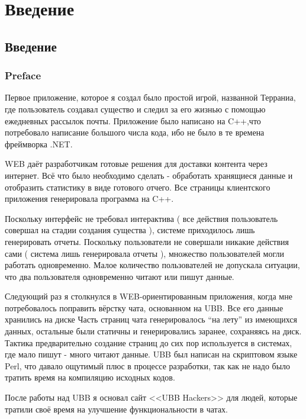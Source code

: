 \chapter*{Введение}							%


\section{ Введение} \label{sect1_1}

\subsection{Preface} \label{subsect1_1_1}

Первое приложение, которое я создал было простой игрой, названной Терраниа, где пользователь создавал существо и следил за его жизнью с помощью ежедневных рассылок почты. Приложение было написано на C++,что потребовало написание большого числа кода, ибо не было в те времена фреймворка .NET.

WEB  даёт разработчикам готовые решения для доставки контента через интернет. Всё что было необходимо сделать - обработать хранящиеся данные и отобразить статистику в виде готового отчего. Все страницы клиентского приложения генерировала программа на C++.

Поскольку интерфейс не требовал интерактива ( все действия пользователь совершал на стадии создания существа ),  системе приходилось лишь генерировать отчеты. Поскольку пользователи не совершали никакие действия сами ( система лишь генерировала отчеты ), множество пользователей могли работать одновременно. Малое количество пользователей не допускала ситуации, что два пользователя одновременно читают или пишут данные.


Следующий раз я столкнулся в WEB-ориентированным приложения, когда мне потребовалось поправить вёрстку чата, основанном на  UBB. Все его данные хранились на диске Часть страниц чата генерировалось ``на лету'' из имеющихся данных, остальные были статичны и генерировались заранее, сохраняясь на диск. Тактика предварительно создание страниц до сих пор используется в системах, где мало пишут - много читают данные. UBB был написан на скриптовом языке Perl, что давало ощутимый плюс в процессе разработки, так как не надо было тратить время на компиляцию исходных кодов.

После работы над UBB я основал сайт <<UBB Hackers>> для людей, которые тратили своё время на улучшение функциональности в чатах. 

